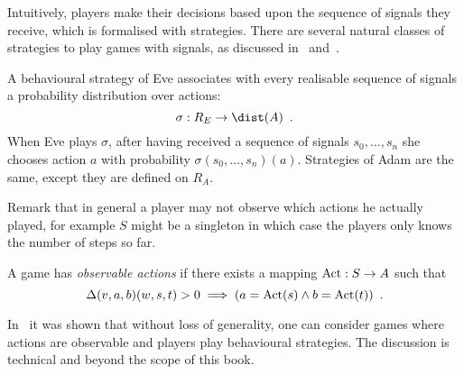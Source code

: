 Intuitively, players make their decisions based upon the sequence of
signals they receive, which is formalised with strategies. 
There are several natural classes of strategies to play games with signals, as discussed in~\cite{horn_remember} and~\cite[Section 4]{BGGjacm}.

A behavioural strategy of Eve associates
with every realisable sequence of signals a probability distribution
over actions:  
\[
\sigma: R_E \to \dist(A)\enspace.
\]
When Eve plays $\sigma$, after having received a sequence of signals
$s_0,\ldots,s_n$ she chooses action $a$ with probability
$\sigma(s_0,\ldots,s_n)(a)$. 
Strategies of Adam are the same, except they are defined on $R_A$.


Remark that in general a player may not observe which actions he actually played,
for example $S$ might be a singleton 
in which case the players only knows the number of steps so far.

A game has \emph{observable actions} if there exists a mapping
 $\text{Act}:S \to A$ 
 such that
\[
\Delta(v,a,b)(w,s,t)>0 
\implies
(a=\text{Act}(s) \land b=\text{Act}(t))\enspace. 
\]

In~\cite[Lemma 4.6 and 4.7]{BGGjacm} it was shown that without loss of generality,
one can consider games where actions are observable and players 
play behavioural strategies. The discussion is technical and beyond the scope of this book.
